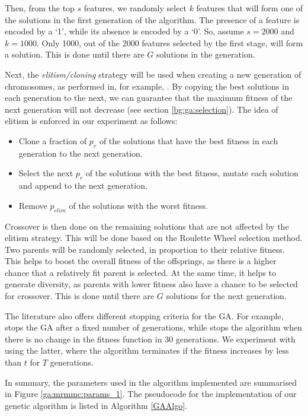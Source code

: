 \documentclass[12pt, twoside, a4paper]{report}
\begin{document}
Then, from the top $s$ features, we randomly select $k$ features that will form one of the solutions in the first generation of the algorithm. The presence of a feature is encoded by a `1', while its absence is encoded by a `0'. So, assume $s=2000$ and $k=1000$. Only 1000, out of the 2000 features selected by the first stage, will form a solution. This is done until there are $G$ solutions in the generation.

Next, the \textit{elitism/cloning} strategy will be used when creating a new generation of chromosomes, as performed in, for example, \cite{RefWorks:212}. By copying the best solutions in each generation to the next, we can guarantee that the maximum fitness of the next generation will not decrease (see section \ref{bg:ga:selection}). The idea of elitism is enforced in our experiment as follows:
\begin{itemize}
  \item Clone a fraction of $p_e$ of the solutions that have the best fitness in each generation to the next generation.
  \item Select the next $p_r$ of the solutions with the best fitness, mutate each solution and append to the next generation.
  \item Remove $p_{elim}$ of the solutions with the worst fitness.
\end{itemize}

Crossover is then done on the remaining solutions that are not affected by the elitism strategy. This will be done based on the Roulette Wheel selection method. Two parents will be randomly selected, in proportion to their relative fitness. This helps to boost the overall fitness of the offsprings, as there is a higher chance that a relatively fit parent is selected. At the same time, it helps to generate diversity, as parents with lower fitness also have a chance to be selected for crossover. This is done until there are $G$ solutions for the next generation.

The literature also offers different stopping criteria for the GA. For example, \cite{RefWorks:202} stops the GA after a fixed number of generations, while \cite{RefWorks:212} stops the algorithm when there is no change in the fitness function in 30 generations. We experiment with using the latter, where the algorithm terminates if the fitness increases by less than $t$ for $T$ generations.

In summary, the parameters used in the algorithm implemented are summarised in Figure \ref{ga:mrmmc:params_1}. The pseudocode for the implementation of our genetic algorithm is listed in Algorithm \ref{GAAlgo}.
\end{document}

